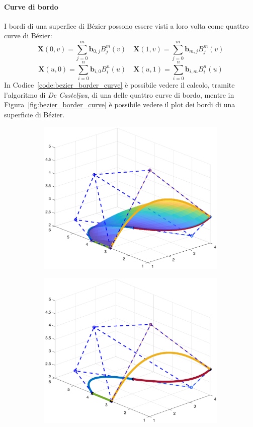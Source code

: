 \documentclass[a4paper, 12pt]{article}
\begin{document}
  \paragraph{Curve di bordo} I bordi di una superfice di Bézier possono essere visti a loro
  volta come quattro curve di Bézier:
  $$\mathbf{X}(0,v) = \sum_{j=0}^{m} \mathbf{b}_{0,j}B_{j}^{m}(v) \quad \mathbf{X}(1,v) = \sum_{j=0}^{m} \mathbf{b}_{m,j}B_{j}^{m}(v)$$
  $$\mathbf{X}(u, 0) = \sum_{i=0}^{n} \mathbf{b}_{i,0}B_{i}^{n}(u) \quad \mathbf{X}(u,1) = \sum_{i=0}^{n} \mathbf{b}_{i, m}B_{i}^{n}(u)$$
  In Codice~\ref{code:bezier_border_curve} è possibile vedere il calcolo, tramite l'algoritmo di \textit{De Casteljau}, di una delle quattro curve di bordo, 
  mentre in Figura~\ref{fig:bezier_border_curve} è possibile vedere 
  il plot dei bordi di una superficie di Bézier.
\begin{figure}[]
  \centering
  \begin{subfigure}[b]{0.3\textwidth}
    \includegraphics[width=\textwidth]{figure/border_curve.eps}
    \label{fig:border_curve}
  \end{subfigure}
  \begin{subfigure}[b]{0.3\textwidth}
      \includegraphics[width=\textwidth]{figure/border_curve_no_surf.eps}

\end{subfigure}
\end{figure}
\end{document}

